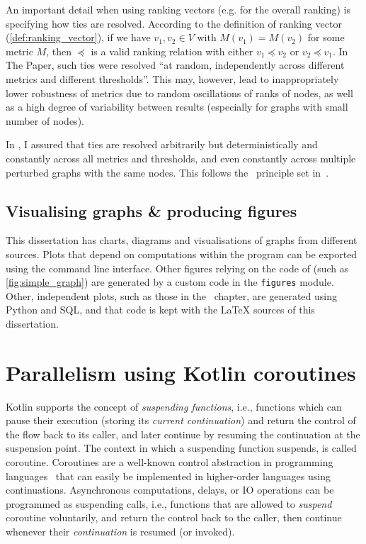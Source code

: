 An important detail when using ranking vectors (e.g. for the overall ranking) is specifying how ties are resolved.
According to the definition of ranking vector (\cref{def:ranking_vector}), if we have $v_1, v_2 \in V$ with $M(v_1) = M(v_2)$ for some metric $M$, then $\preceq$ is a valid ranking relation with either $v_1 \preceq v_2$ or $v_2 \preceq v_1$.
In The Paper, such ties were resolved \enquote{at random, independently across different metrics and different thresholds}.
This may, however, lead to inappropriately lower robustness of metrics due to random oscillations of ranks of nodes, as well as a high degree of variability between results (especially for graphs with small number of nodes).

In \graffs, I assured that ties are resolved arbitrarily but deterministically and constantly across all metrics and thresholds, and even constantly across multiple perturbed graphs with the same nodes.
This follows the~ principle set in~.

\subsection{Visualising graphs \& producing figures}

This dissertation has charts, diagrams and visualisations of graphs from different sources.
Plots that depend on computations within the \graffs program can be exported using the command line interface.
Other figures relying on the code of \graffs (such as \cref{fig:simple_graph}) are generated by a custom code in the \texttt{figures} module.
Other, independent plots, such as those in the~ chapter, are generated using Python and SQL, and that code is kept with the LaTeX sources of this dissertation.


\section{Parallelism using Kotlin coroutines}\label{sec:kotlin_coroutines}

Kotlin supports the concept of \textsl{suspending functions}, i.e., functions which can pause their execution (storing its \textsl{current continuation}) and return the control of the flow back to its caller, and later continue by resuming the continuation at the suspension point.
The context in which a suspending function suspends, is called coroutine.
Coroutines are a well-known control abstraction in programming languages~\cite{MouraRevisitingCoroutines2009} that can easily be implemented in higher-order languages using continuations\cite{HaynesContinuationsCoroutines1984}.
Asynchronous computations, delays, or IO operations can be programmed as suspending calls, i.e., functions that are allowed to \textsl{suspend} coroutine voluntarily, and return the control back to the caller, then continue whenever their \textsl{continuation} is resumed (or invoked).


